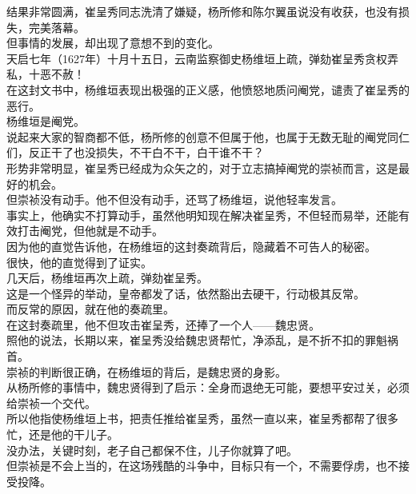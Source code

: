 \begin{multicols}{\theparacolNo}
结果非常圆满，崔呈秀同志洗清了嫌疑，杨所修和陈尔翼虽说没有收获，也没有损失，完美落幕。\\

但事情的发展，却出现了意想不到的变化。\\

天启七年（1627年）十月十五日，云南监察御史杨维垣上疏，弹劾崔呈秀贪权弄私，十恶不赦！\\

在这封文书中，杨维垣表现出极强的正义感，他愤怒地质问阉党，谴责了崔呈秀的恶行。\\

杨维垣是阉党。\\

说起来大家的智商都不低，杨所修的创意不但属于他，也属于无数无耻的阉党同仁们，反正干了也没损失，不干白不干，白干谁不干？\\

形势非常明显，崔呈秀已经成为众矢之的，对于立志搞掉阉党的崇祯而言，这是最好的机会。\\

但崇祯没有动手。他不但没有动手，还骂了杨维垣，说他轻率发言。\\

事实上，他确实不打算动手，虽然他明知现在解决崔呈秀，不但轻而易举，还能有效打击阉党，但他就是不动手。\\

因为他的直觉告诉他，在杨维垣的这封奏疏背后，隐藏着不可告人的秘密。\\

很快，他的直觉得到了证实。\\

几天后，杨维垣再次上疏，弹劾崔呈秀。\\

这是一个怪异的举动，皇帝都发了话，依然豁出去硬干，行动极其反常。\\

而反常的原因，就在他的奏疏里。\\

在这封奏疏里，他不但攻击崔呈秀，还捧了一个人——魏忠贤。\\

照他的说法，长期以来，崔呈秀没给魏忠贤帮忙，净添乱，是不折不扣的罪魁祸首。\\

崇祯的判断很正确，在杨维垣的背后，是魏忠贤的身影。\\

从杨所修的事情中，魏忠贤得到了启示：全身而退绝无可能，要想平安过关，必须给崇祯一个交代。\\

所以他指使杨维垣上书，把责任推给崔呈秀，虽然一直以来，崔呈秀都帮了很多忙，还是他的干儿子。\\

没办法，关键时刻，老子自己都保不住，儿子你就算了吧。\\

但崇祯是不会上当的，在这场残酷的斗争中，目标只有一个，不需要俘虏，也不接受投降。\\
\ifnum{}
	\end{multicols}
\fi
\newpage

